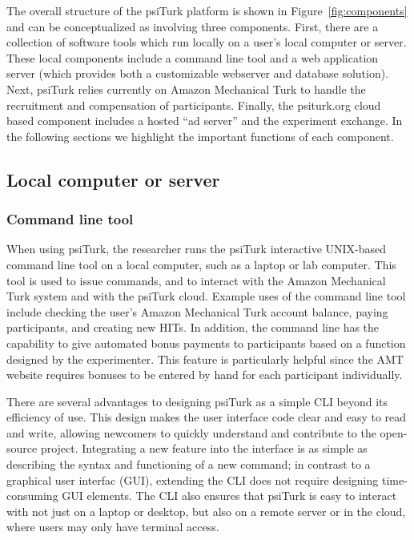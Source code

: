 \documentclass[twocolumn]{svjour3}          %
\newcommand{\psiturk}[0]{\textsf{psiTurk}}
\begin{document}
The overall structure of the \psiturk{} platform is shown in Figure~\ref{fig:components}
and can be conceptualized as involving three components.
First, there are a collection of software tools which run locally on a user's
local computer or server.  These local components include a command line tool and 
a web application server (which provides both a customizable webserver and 
database solution).  Next, \psiturk{} relies currently on Amazon
Mechanical Turk to handle the recruitment and compensation of participants.
Finally, the \textsf{psiturk.org} cloud based component includes a hosted ``ad server'' 
and the experiment exchange.  In the following sections we highlight the important 
functions of each component.

\subsection{Local computer or server}

\subsubsection{Command line tool}
\label{sec:cli}

When using \psiturk{}, the researcher runs the \psiturk{}
interactive UNIX-based command line tool on a local computer, such as a laptop
or lab computer. This tool is used to issue commands, and to interact with the
Amazon Mechanical Turk system and with the \psiturk{} cloud.  Example
uses of the command line tool include checking the user's Amazon Mechanical
Turk account balance, paying participants, and creating new HITs. In addition,
the command line has the capability to give automated bonus payments to
participants based on a function designed by the experimenter. This feature is
particularly helpful since the AMT website requires bonuses to be entered by
hand for each participant individually.

There are several advantages to designing \psiturk{} as a simple CLI beyond its
efficiency of use. This design makes the user interface code clear and easy to
read and write, allowing newcomers to quickly understand and contribute to the
open-source project. Integrating a new feature into the interface is as simple
as describing the syntax and functioning of a new command; in contrast to a
graphical user interfac (GUI), extending the CLI does not require designing
time-consuming GUI elements.  The CLI also ensures that \psiturk{} is easy to
interact with not just on a laptop or desktop, but also on a remote server or
in the cloud, where users may only have terminal access.
\end{document}
